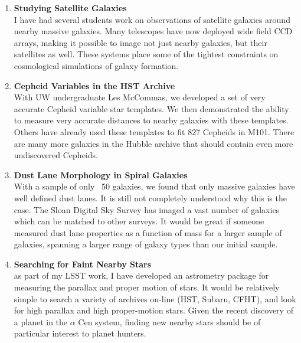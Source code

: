 \documentclass[letterpaper, 11pt]{article}
\newcommand{\upcite}[1]{{\scriptsize{\textsuperscript{\cite{#1}}}}}
\begin{document}
\begin{enumerate}

\item{ {\bf Studying Satellite Galaxies}\\
I have had several students work on observations of satellite galaxies around nearby massive galaxies.  Many telescopes have now deployed wide field CCD arrays, making it possible to image not just nearby galaxies, but their satellites as well.  These systems place some of the tightest constraints on cosmological simulations of galaxy formation.}

\item{ {\bf Cepheid Variables in the HST Archive}\\
With UW undergraduate Les McCommas, we developed a set of very accurate Cepheid variable star templates\upcite{Yoachim09b}.  We then demonstrated the ability to measure very accurate distances to nearby galaxies with these templates\upcite{McCommas09}.  Others have already used these templates to fit 827 Cepheids in M101\upcite{Shappee11}.  There are many more galaxies in the Hubble archive that should contain even more undiscovered Cepheids.
}

\item{ {\bf Dust Lane Morphology in Spiral Galaxies}\\
With a sample of only ~50 galaxies, we found that only massive galaxies have well defined dust lanes\upcite{Dalcanton04}.  It is still not completely understood why this is the case.  The Sloan Digital Sky Survey has imaged a vast number of galaxies which can be matched to other surveys.  It would be great if someone measured dust lane properties as a function of mass for a larger sample of galaxies, spanning a larger range of galaxy types than our initial sample.
}

\item{ {\bf Searching for Faint Nearby Stars} \\
as part of my LSST work, I have developed an astrometry package for measuring the parallax and proper motion of stars.  It would be relatively simple to search a variety of archives on-line (HST, Subaru, CFHT), and look for high parallax and high proper-motion stars.  Given the recent discovery of a planet in the $\alpha$ Cen system, finding new nearby stars should be of particular interest to planet hunters.
}
\end{enumerate}
\end{document}
